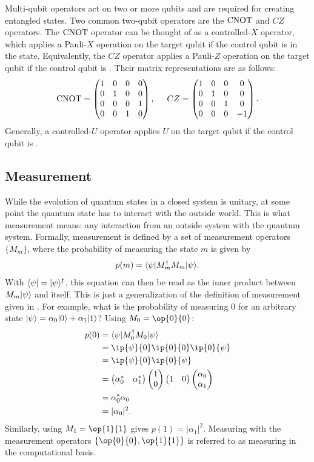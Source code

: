 Multi-qubit operators act on two or more qubits and are required for creating entangled states.
Two common two-qubit operators are the $\textnormal{CNOT}$ and $CZ$ operators.
The $\textnormal{CNOT}$ operator can be thought of as a controlled-$X$ operator, which applies a Pauli-$X$ operation on the target qubit if the control qubit is in the  state.
Equivalently, the $CZ$ operator applies a Pauli-$Z$ operation on the target qubit if the control qubit is .
Their matrix representations are as follows:
\begin{equation}
\textnormal{CNOT} = \begin{pmatrix} 1 & 0 & 0 & 0 \\ 0 & 1 & 0 & 0 \\ 0 & 0 & 0 & 1 \\ 0 & 0 & 1 & 0 \\ \end{pmatrix}{}, \hspace*{5mm}
CZ = \begin{pmatrix} 1 & 0 & 0 & 0 \\ 0 & 1 & 0 & 0 \\ 0 & 0 & 1 & 0 \\ 0 & 0 & 0 & -1 \\ \end{pmatrix}{}.
\end{equation}
Generally, a controlled-$U$ operator applies $U$ on the target qubit if the control qubit is .

\subsection{Measurement}
While the evolution of quantum states in a closed system is unitary, at some point the quantum state has to interact with the outside world.
This is what measurement means: any interaction from an outside system with the quantum system.
Formally, measurement is defined by a set of measurement operators  $\{M_m\}$, where the probability of measuring the state $m$ is given by
\begin{equation}
p(m) = \langle{\psi}\vert M_m^\dagger M_m\vert{\psi}\rangle.
\end{equation}
With $\langle{\psi}\vert = \vert{\psi}\rangle^\dagger$, this equation can then be read as the inner product between $M_m\vert{\psi}\rangle$ and itself. 
This is just a generalization of the definition of measurement given in .
For example, what is the probability of measuring 0 for an arbitrary state $\vert{\psi}\rangle = \alpha_0\vert{0}\rangle + \alpha_1\vert{1}\rangle$?
Using $M_0 = \op{0}{0}$:
\begin{equation} \label{eqn:measurement}
\begin{aligned} 
p(0) &= \bra{\psi}M_0^\dagger M_0\ket{\psi} \\
&= \ip{\psi}{0}\ip{0}{0}\ip{0}{\psi} \\
&= \ip{\psi}{0}\ip{0}{\psi} \\
&= \begin{pmatrix}\alpha_0^* & \alpha_1^*\end{pmatrix}\begin{pmatrix}1 \\ 0\end{pmatrix}
\begin{pmatrix}1 & 0\end{pmatrix}\begin{pmatrix}\alpha_0 \\ \alpha_1\end{pmatrix} \\
&= \alpha_0^* \alpha_0 \\
&= |\alpha_0|^2.
\end{aligned}
\end{equation}
Similarly, using $M_1 = \op{1}{1}$ gives $p(1) = |\alpha_1|^2$.
Measuring with the measurement operators $\left\{\op{0}{0}, \op{1}{1}\right\}$ is referred to as measuring in the computational basis.


